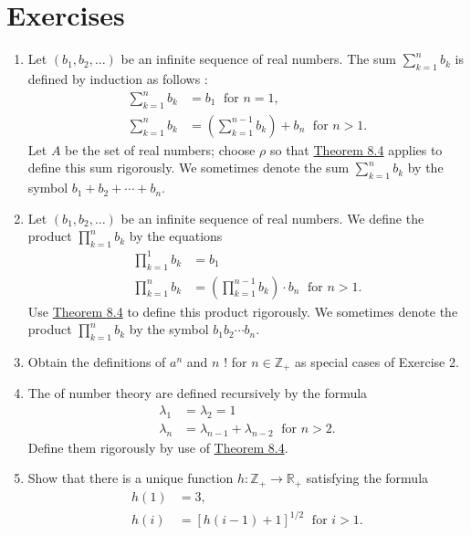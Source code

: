 \section*{Exercises}
\begin{enumerate}[itemsep=0.4em, parsep=0pt, topsep=0pt, partopsep=0pt, leftmargin=*, label=\arabic*., ref=\arabic*]
\item Let \(({b_{1},b_{2},\ldots })\) be an infinite sequence of real numbers. The sum \(\mathop{\sum }\limits_{{k = 1}}^{n}b_{k}\) is defined by induction as follows : \[ \begin{aligned} \mathop{\sum }\limits_{{k = 1}}^{n}b_{k} &= b_{1}\;\text{ for }n = 1, \\ \mathop{\sum }\limits_{{k = 1}}^{n}b_{k} &= ({\mathop{\sum }\limits_{{k = 1}}^{{n - 1}}b_{k}}) + b_{n}\;\text{ for }n > 1. \end{aligned} \] Let \(A\) be the set of real numbers; choose \(\rho\) so that \hyperref[thm:8.4]{Theorem 8.4} applies to define this sum rigorously. We sometimes denote the sum \(\mathop{\sum }\limits_{{k = 1}}^{n}b_{k}\) by the symbol \(b_{1} + b_{2} + \cdots + b_{n}\).
\item Let \(({b_{1},b_{2},\ldots })\) be an infinite sequence of real numbers. We define the product \(\mathop{\prod }\limits_{{k = 1}}^{n}b_{k}\) by the equations \[ \begin{aligned} \mathop{\prod }\limits_{{k = 1}}^{1}b_{k} &= b_{1} \\ \mathop{\prod }\limits_{{k = 1}}^{n}b_{k} &= ({\mathop{\prod }\limits_{{k = 1}}^{{n - 1}}b_{k}}) \cdot {b}_{n}\;\text{ for }n > 1. \end{aligned} \] Use \hyperref[thm:8.4]{Theorem 8.4} to define this product rigorously. We sometimes denote the product \(\mathop{\prod }\limits_{{k = 1}}^{n}b_{k}\) by the symbol \(b_{1}b_{2}\cdots {b}_{n}\).
\item Obtain the definitions of \(a^{n}\) and \(n\) ! for \(n \in {\mathbb{Z}}_{+}\) as special cases of Exercise 2.
\item The  of number theory are defined recursively by the formula \[ \begin{aligned} {\lambda }_{1} &= {\lambda }_{2} = 1 \\ {\lambda }_{n} &= {\lambda }_{n - 1} + {\lambda }_{n - 2}\;\text{ for }n > 2. \end{aligned} \] Define them rigorously by use of \hyperref[thm:8.4]{Theorem 8.4}.
\item Show that there is a unique function \(h : \mathbb{Z}_{+} \rightarrow {\mathbb{R}}_{+}\) satisfying the formula \[ \begin{aligned} h(1) &= 3, \\ h(i) &= {[ h( i - 1) + 1] }^{1/2}\;\text{ for }i > 1. \end{aligned} \]

\end{enumerate}
